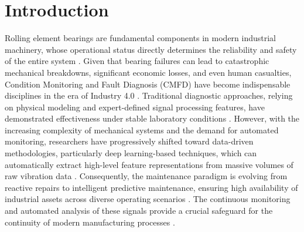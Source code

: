 \section{Introduction}
\label{sec:introduction}

Rolling element bearings are fundamental components in modern industrial machinery, whose operational status directly determines the reliability and safety of the entire system \cite{lei2020deep_fault, jia2016sae_bearing}. Given that bearing failures can lead to catastrophic mechanical breakdowns, significant economic losses, and even human casualties, Condition Monitoring and Fault Diagnosis (CMFD) have become indispensable disciplines in the era of Industry 4.0 \cite{smith_cwru, zhang2021cwru_review, jia2016sae_bearing}. Traditional diagnostic approaches, relying on physical modeling and expert-defined signal processing features, have demonstrated effectiveness under stable laboratory conditions \cite{samanta2006svm_bearing, saidi2022triplet_svm, support2019svm_bearing}. However, with the increasing complexity of mechanical systems and the demand for automated monitoring, researchers have progressively shifted toward data-driven methodologies, particularly deep learning-based techniques, which can automatically extract high-level feature representations from massive volumes of raw vibration data \cite{chen2023cwru_deep, chen2021sae_fault, shao2018sae_bearing}. Consequently, the maintenance paradigm is evolving from reactive repairs to intelligent predictive maintenance, ensuring high availability of industrial assets across diverse operating scenarios \cite{lei2020deep_fault, chen2023cwru_deep, zhang2021cwru_review}. The continuous monitoring and automated analysis of these signals provide a crucial safeguard for the continuity of modern manufacturing processes \cite{smith_cwru, jia2016sae_bearing}.

